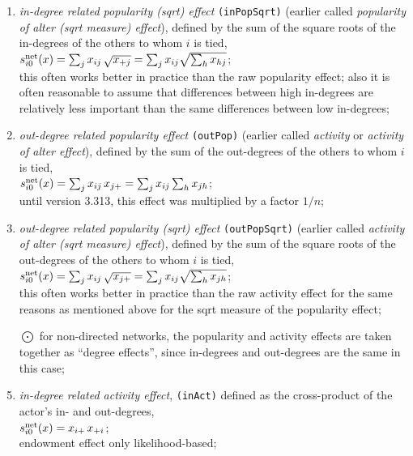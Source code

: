 \documentclass[a4paper,fleqn,11pt]{article}
\newcommand{\+}{\, + \,}
\newcommand{\vit}{\theenumi}
\begin{document}
\begin{enumerate}
 \item {\em in-degree related popularity (sqrt) effect} \texttt{(inPopSqrt)}
 (earlier called {\em popularity of alter (sqrt measure) effect}), defined by the sum of
 the square roots of the in-degrees of the others to whom $i$ is tied,\\
 $s^{\rm net}_{i\vit}(x) = \sum_j x_{ij}\, \sqrt{x_{+j}} =
  \sum_j x_{ij} \sqrt{\sum_h x_{hj}} $;\\
 this often works better in practice than the raw popularity effect;
 also it is often reasonable to assume that differences between high in-degrees are
 relatively less important than the same differences between low
 in-degrees;

 \item {\em out-degree related popularity effect} \texttt{(outPop)}
 (earlier called {\em activity} or {\em activity of alter effect}), defined by
  the sum of the out-degrees
 of the others to whom $i$ is tied,\\
 $s^{\rm net}_{i\vit}(x) =  \sum_j x_{ij}\, x_{j+} =
  \sum_j x_{ij} \sum_h x_{jh} $; \\
 until version 3.313, this effect was multiplied by a factor $1/n$;


 \item {\em out-degree related popularity (sqrt) effect} \texttt{(outPopSqrt)}
 (earlier called {\em activity of alter (sqrt measure) effect}), defined by the sum of
 the square roots of the out-degrees of the others to whom $i$ is tied,\\
 $s^{\rm net}_{i\vit}(x) = \sum_j x_{ij}\, \sqrt{x_{j+}} =
  \sum_j x_{ij} \sqrt{\sum_h x_{jh}} $;\\
 this often works better in practice than the raw activity effect
 for the same reasons as mentioned above for the sqrt measure of the popularity effect;


 \item[{\hspace*{-1ex}$\bigodot$}] for non-directed networks, the popularity and activity
 effects are taken together as ``degree effects'',
 since in-degrees and out-degrees are the same in this case;

 \item {\em in-degree related activity effect}, \texttt{(inAct)}
 defined as  the cross-product  of the actor's in- and out-degrees,\\
 $s^{\rm net}_{i\vit}(x) = x_{i+}\, x_{+i}$;\\
 endowment effect only likelihood-based;


\end{enumerate}
\end{document}
